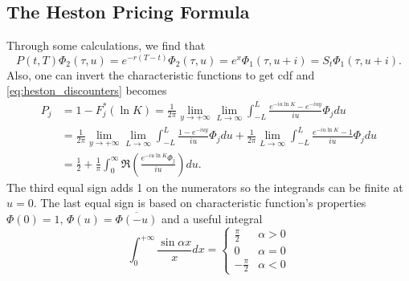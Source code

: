 \documentclass[a4paper,12pt]{article}
\numberwithin{equation}{section}
\theoremstyle{definition}
\theoremstyle{remark}
\begin{document}
\subsection{The Heston Pricing Formula}
Through some calculations, we find that 
\begin{equation}
    P(t,T)\Phi_{2}(\tau,u)=e^{-r(T-t)}\Phi_{2}(\tau,u)
    =e^{x}\Phi_{1}(\tau,u+i)=S_{t}\Phi_{1}(\tau,u+i).
\end{equation}
Also, one can invert the characteristic functions to get cdf and 
\eqref{eq:heston_discounters} becomes
\begin{equation}
\begin{split}
    P_{j}&=1-F^{*}_{j}(\ln K)=\frac{1}{2\pi}\lim_{y\rightarrow+\infty}
    \lim_{L\rightarrow\infty}\int_{-L}^{L} \frac{e^{-iu\ln K}-e^{-iuy}}{iu}\Phi_{j} du \\
    &=\frac{1}{2\pi}\lim_{y\rightarrow+\infty}\lim_{L\rightarrow\infty}
    \int_{-L}^{L} \frac{1-e^{-iuy}}{iu}\Phi_{j} du+\frac{1}{2\pi}
    \lim_{L\rightarrow\infty}\int_{-L}^{L} \frac{e^{-iu\ln K}-1}{iu}\Phi_{j} du \\
    &=\frac{1}{2}+\frac{1}{\pi}\int_{0}^{\infty} \Re
    \left(\frac{e^{-iu\ln K}\Phi_{j}}{iu}\right) du.
\end{split}
\end{equation}
The third equal sign adds 1 on the numerators so the integrands 
can be finite at $u=0$. The last equal sign is based on characteristic 
function's properties $\Phi(0)=1,\,\Phi(u)=\overline{\Phi(-u)}$ 
and a useful integral 
\begin{equation}
    \int_{0}^{+\infty} \frac{\sin\alpha x}{x} dx=
    \begin{cases}
        \frac{\pi}{2} & \alpha>0 \\
        0 & \alpha=0 \\
        -\frac{\pi}{2} & \alpha<0
    \end{cases}
\end{equation}
\end{document}
